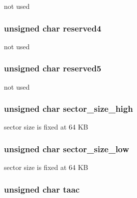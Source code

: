not used \hypertarget{struct_c_s_d_v2_a1dcde2e7c54e279f4d7aac27d130cc17}{
\subsubsection[{reserved4}]{\setlength{\rightskip}{0pt plus 5cm}unsigned char reserved4}}\label{struct_c_s_d_v2_a1dcde2e7c54e279f4d7aac27d130cc17}
not used \hypertarget{struct_c_s_d_v2_a6dd54d3f51fc8f0916d8882851d26d91}{
\subsubsection[{reserved5}]{\setlength{\rightskip}{0pt plus 5cm}unsigned char reserved5}}\label{struct_c_s_d_v2_a6dd54d3f51fc8f0916d8882851d26d91}
not used \hypertarget{struct_c_s_d_v2_a2580a4c6ddd99928402db34c2f650033}{
\subsubsection[{sector\-\_\-size\-\_\-high}]{\setlength{\rightskip}{0pt plus 5cm}unsigned char sector\-\_\-size\-\_\-high}}\label{struct_c_s_d_v2_a2580a4c6ddd99928402db34c2f650033}
sector size is fixed at 64 K\-B \hypertarget{struct_c_s_d_v2_afcbc43e43942a772e79ef2aa55e37650}{
\subsubsection[{sector\-\_\-size\-\_\-low}]{\setlength{\rightskip}{0pt plus 5cm}unsigned char sector\-\_\-size\-\_\-low}}\label{struct_c_s_d_v2_afcbc43e43942a772e79ef2aa55e37650}
sector size is fixed at 64 K\-B \hypertarget{struct_c_s_d_v2_add15a5302761bd6e2ee294c0c38e9f8a}{
\subsubsection[{taac}]{\setlength{\rightskip}{0pt plus 5cm}unsigned char taac}}\label{struct_c_s_d_v2_add15a5302761bd6e2ee294c0c38e9f8a}

